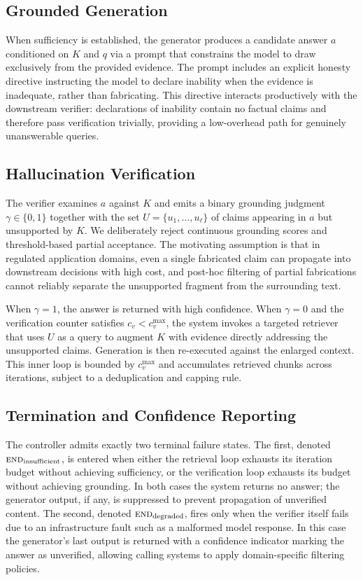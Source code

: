\subsection{Grounded Generation}
\label{sec:generation}

When sufficiency is established, the generator produces a candidate
answer $a$ conditioned on $K$ and $q$ via a prompt that constrains the
model to draw exclusively from the provided evidence. The prompt
includes an explicit honesty directive instructing the model to declare
inability when the evidence is inadequate, rather than fabricating.
This directive interacts productively with the downstream verifier:
declarations of inability contain no factual claims and therefore pass
verification trivially, providing a low-overhead path for genuinely
unanswerable queries.

\subsection{Hallucination Verification}
\label{sec:verification}

The verifier examines $a$ against $K$ and emits a binary grounding
judgment $\gamma \in \{0, 1\}$ together with the set
$U = \{u_1, \ldots, u_\ell\}$ of claims appearing in $a$ but unsupported
by $K$. We deliberately reject continuous grounding scores and
threshold-based partial acceptance. The motivating assumption is that
in regulated application domains, even a single fabricated claim can
propagate into downstream decisions with high cost, and post-hoc
filtering of partial fabrications cannot reliably separate the
unsupported fragment from the surrounding text.

When $\gamma = 1$, the answer is returned with high confidence. When
$\gamma = 0$ and the verification counter satisfies $c_v < c_v^{\max}$,
the system invokes a targeted retriever that uses $U$ as a query to
augment $K$ with evidence directly addressing the unsupported claims.
Generation is then re-executed against the enlarged context. This
inner loop is bounded by $c_v^{\max}$ and accumulates retrieved
chunks across iterations, subject to a deduplication and capping rule.

\subsection{Termination and Confidence Reporting}
\label{sec:termination}

The controller admits exactly two terminal failure states. The first,
denoted $\textsc{end}_{\text{insufficient}}$, is entered when either
the retrieval loop exhausts its iteration budget without achieving
sufficiency, or the verification loop exhausts its budget without
achieving grounding. In both cases the system returns no answer; the
generator output, if any, is suppressed to prevent propagation of
unverified content. The second, denoted $\textsc{end}_{\text{degraded}}$,
fires only when the verifier itself fails due to an infrastructure
fault such as a malformed model response. In this case the generator's
last output is returned with a confidence indicator marking the answer
as unverified, allowing calling systems to apply domain-specific
filtering policies.

